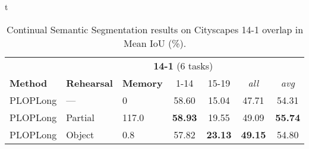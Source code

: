 t\begin{table}[t]
    \centering
    \caption{Continual Semantic Segmentation results on Cityscapes 14-1 overlap in Mean IoU (\%).}
    \vspace*{-0.3cm}
    \label{tab:cityscapes_rehearsal}
    \begin{tabular}{@{}l|p{1cm}p{1cm}|cccc@{}}
        \toprule
                        & \multicolumn{6}{c}{\textbf{14-1} (6 tasks)}                                                                                       \\
        \textbf{Method} & \textbf{Rehearsal}                          & \textbf{Memory} & 1-14           & 15-19          & \textit{all}   & \textit{avg}   \\
        \midrule
        PLOPLong        & ---                                         & 0               & 58.60          & 15.04          & 47.71          & 54.31          \\
        PLOPLong        & Partial                                     & 117.0           & \textbf{58.93} & 19.55          & 49.09          & \textbf{55.74} \\
        PLOPLong        & Object                                      & 0.8             & 57.82          & \textbf{23.13} & \textbf{49.15} & 54.80          \\
        \bottomrule
    \end{tabular}
\end{table}
